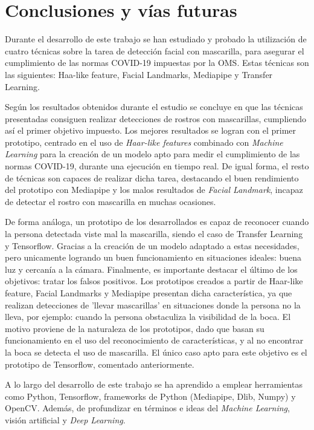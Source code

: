 
\chapter{Conclusiones y vías futuras}

Durante el desarrollo de este trabajo se han estudiado y probado la utilización de cuatro técnicas sobre la tarea de detección facial con mascarilla, para asegurar el cumplimiento de las normas COVID-19 impuestas por la OMS. Estas técnicas son las siguientes: Haa-like feature, Facial Landmarks, Mediapipe y Transfer Learning.

Según los resultados obtenidos durante el estudio se concluye en que las técnicas presentadas consiguen realizar detecciones de rostros con mascarillas, cumpliendo así el primer objetivo impuesto. Los mejores resultados se logran con el primer prototipo, centrado en el uso de \textit{Haar-like features} combinado con \textit{Machine Learning} para la creación de un modelo apto para medir el cumplimiento de las normas COVID-19, durante una ejecución en tiempo real. De igual forma, el resto de técnicas son capaces de realizar dicha tarea, destacando el buen rendimiento del prototipo con Mediapipe y los malos resultados de \textit{Facial Landmark}, incapaz de detectar el rostro con mascarilla en muchas ocasiones.

De forma análoga, un prototipo de los desarrollados es capaz de reconocer cuando la persona detectada viste mal la mascarilla, siendo el caso de Transfer Learning y Tensorflow. Gracias a la creación de un modelo adaptado a estas necesidades, pero unicamente logrando un buen funcionamiento en situaciones ideales: buena luz y cercanía a la cámara. Finalmente, es importante destacar el último de los objetivos: tratar los falsos positivos. Los prototipos creados a partir de Haar-like feature, Facial Landmarks y Mediapipe presentan dicha característica, ya que realizan detecciones de 'llevar mascarillas' en situaciones donde la persona no la lleva, por ejemplo: cuando la persona obstaculiza la visibilidad de la boca. El motivo proviene de la naturaleza de los prototipos, dado que basan su funcionamiento en el uso del reconocimiento de características, y al no encontrar la boca se detecta el uso de mascarilla. El único caso apto para este objetivo es el prototipo de Tensorflow, comentado anteriormente.

A lo largo del desarrollo de este trabajo se ha aprendido a emplear herramientas como Python, Tensorflow, frameworks de Python (Mediapipe, Dlib, Numpy) y OpenCV. Además, de profundizar en términos e ideas del \textit{Machine Learning}, visión artificial y \textit{Deep Learning}.

